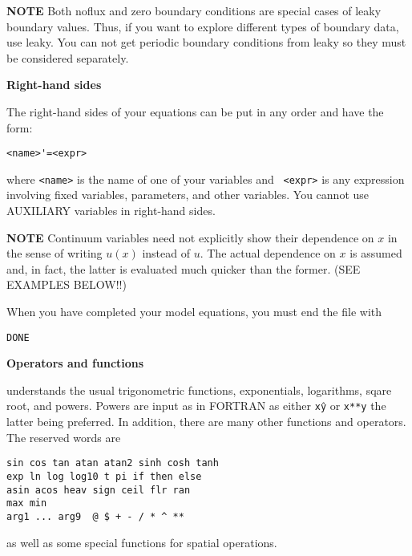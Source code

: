 {\bf NOTE} Both noflux and zero boundary conditions are special cases
of leaky boundary values.  Thus, if you want to explore different
types of boundary data, use leaky. You can not get periodic boundary
conditions from leaky so they must be considered separately.

\vspace{.25in}
\begin{center}
{\bf \large Right-hand sides}
\end{center}

The right-hand sides of your equations can be put in any order and
have the form:
\begin{verbatim}
<name>'=<expr>
\end{verbatim}
where {\tt <name>} is the name of one of your variables and {\tt
<expr>} is any expression involving fixed variables, parameters, and
other variables.  You cannot use AUXILIARY variables in right-hand
sides.  

{\bf NOTE} Continuum variables need not explicitly show their
dependence on $x$ in the sense of writing $u(x)$ instead of $u.$  The
actual dependence on $x$ is assumed and, in fact, the latter is
evaluated much quicker than the former.  (SEE EXAMPLES BELOW!!)
 
When you have completed your model equations, you must end the file
with 
\begin{verbatim}
DONE
\end{verbatim}

\vspace{.25in}
\begin{center}
{\bf\large Operators and functions}
\end{center}

\xtc understands the usual trigonometric functions, exponentials,
logarithms, sqare root, and powers.  Powers are input as in FORTRAN as
either {\tt x\^y} or {\tt x**y} the latter being preferred. In
addition, there are many other functions and operators.  The reserved
words are
\begin{verbatim}
sin cos tan atan atan2 sinh cosh tanh
exp ln log log10 t pi if then else
asin acos heav sign ceil flr ran
max min 
arg1 ... arg9  @ $ + - / * ^ **
\end{verbatim}
as well as some special functions for spatial operations.

